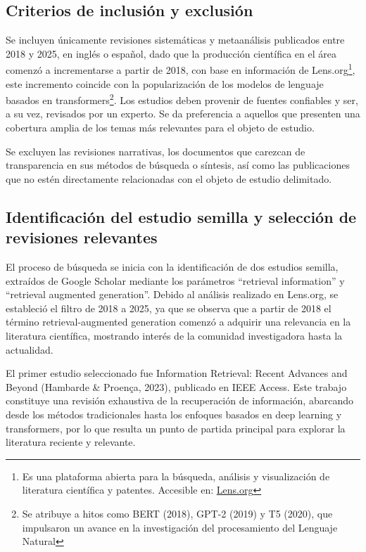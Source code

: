 \subsection{Criterios de inclusión y exclusión}
Se incluyen únicamente revisiones sistemáticas y metaanálisis publicados entre 2018 y 2025, en inglés o español, dado que la producción 
científica en el área comenzó a incrementarse a partir de 2018, con base en información de Lens.org\footnote{Es una plataforma abierta
para la búsqueda, análisis y visualización de literatura científica y patentes. Accesible en: \href{https://www.lens.org/}{Lens.org}}, este incremento coincide
con la popularización 
de los modelos de lenguaje basados en transformers\footnote{Se atribuye a hitos como BERT (2018), GPT-2 (2019) y T5 (2020), que impulsaron un avance 
en la investigación del procesamiento del Lenguaje Natural}.
Los estudios deben provenir de fuentes confiables y ser, a su vez, revisados por 
un experto. Se da preferencia a aquellos que presenten una cobertura amplia de los temas más relevantes para el objeto de estudio.  

Se excluyen las revisiones narrativas, los documentos que carezcan de transparencia en sus métodos de búsqueda o síntesis, así como las publicaciones que no estén 
directamente relacionadas con el objeto de estudio delimitado.

\subsection{Identificación del estudio semilla y selección de revisiones relevantes}
El proceso de búsqueda se inicia con la identificación de dos estudios semilla, extraídos de Google Scholar mediante los parámetros “retrieval information” y “retrieval augmented generation”. 
Debido al análisis realizado en Lens.org, se estableció el filtro de 2018 a 2025, ya que se observa que a partir de 2018 el término retrieval-augmented generation 
comenzó a adquirir una relevancia en la literatura científica, mostrando interés de la comunidad investigadora hasta la actualidad.

El primer estudio seleccionado fue Information Retrieval: Recent Advances and Beyond (Hambarde \& Proença, 2023), publicado en IEEE Access. 
Este trabajo constituye una revisión exhaustiva de la recuperación de información, abarcando desde los métodos tradicionales hasta los enfoques 
basados en deep learning y transformers, por lo que resulta un punto de partida principal para explorar la literatura reciente y relevante.

